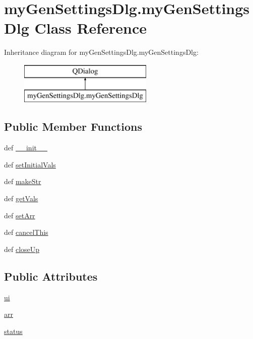 \hypertarget{classmy_gen_settings_dlg_1_1my_gen_settings_dlg}{\section{my\-Gen\-Settings\-Dlg.\-my\-Gen\-Settings\-Dlg Class Reference}
\label{classmy_gen_settings_dlg_1_1my_gen_settings_dlg}
}
Inheritance diagram for my\-Gen\-Settings\-Dlg.\-my\-Gen\-Settings\-Dlg\-:\begin{figure}[H]
\begin{center}
\leavevmode
\includegraphics[height=2.000000cm]{classmy_gen_settings_dlg_1_1my_gen_settings_dlg}
\end{center}
\end{figure}
\subsection*{Public Member Functions}
\begin{DoxyCompactItemize}
\item 
def \hyperlink{classmy_gen_settings_dlg_1_1my_gen_settings_dlg_a3448925fd65dc436f29ba58f0c7e9deb}{\-\_\-\-\_\-init\-\_\-\-\_\-}
\item 
def \hyperlink{classmy_gen_settings_dlg_1_1my_gen_settings_dlg_a40a26f42e44ecf94a5b89092ab317175}{set\-Initial\-Vals}
\item 
def \hyperlink{classmy_gen_settings_dlg_1_1my_gen_settings_dlg_a5dd7698aba9583809754a31fc8238672}{make\-Str}
\item 
def \hyperlink{classmy_gen_settings_dlg_1_1my_gen_settings_dlg_a4f80cb0ec2b9ae4d4fc1ce406007d791}{get\-Vals}
\item 
def \hyperlink{classmy_gen_settings_dlg_1_1my_gen_settings_dlg_aa06ce3e18bd1fdbfc32f72ae686f4813}{set\-Arr}
\item 
def \hyperlink{classmy_gen_settings_dlg_1_1my_gen_settings_dlg_a03b1388aa3a51707339623b639675e15}{cancel\-This}
\item 
def \hyperlink{classmy_gen_settings_dlg_1_1my_gen_settings_dlg_a14c60bbaa985b6bceea42afe3fb1a44c}{close\-Up}
\end{DoxyCompactItemize}
\subsection*{Public Attributes}
\begin{DoxyCompactItemize}
\item 
\hyperlink{classmy_gen_settings_dlg_1_1my_gen_settings_dlg_a7273bd37d323cb99b1babfe474fb0794}{ui}
\item 
\hyperlink{classmy_gen_settings_dlg_1_1my_gen_settings_dlg_abb00b15bb0a18384e61e828dd8df30b7}{arr}
\item 
\hyperlink{classmy_gen_settings_dlg_1_1my_gen_settings_dlg_a0a6c727a9bd3bc9a5eccb189f58e0a6a}{status}
\end{DoxyCompactItemize}
